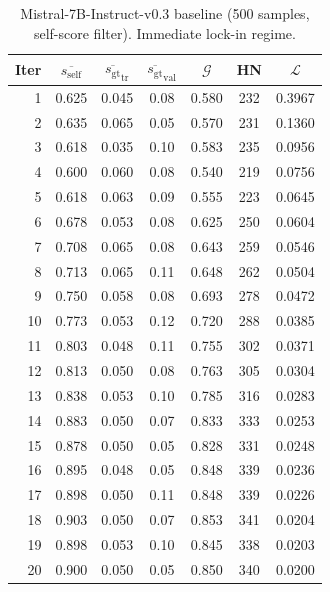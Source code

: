 \documentclass{article}
\newcommand{\gap}{\mathcal{G}}          %
\newcommand{\self}{s_{\text{self}}}     %
\newcommand{\gt}{s_{\text{gt}}}         %
\begin{document}
\begin{table}[h]
\centering
\caption{Mistral-7B-Instruct-v0.3 baseline (500 samples, self-score filter). Immediate lock-in regime.}
\label{tab:app-mistral}
\small
\begin{tabular}{rcccccc}
\toprule
Iter & $\overline{\self}$ & $\overline{\gt}_\text{tr}$ & $\overline{\gt}_\text{val}$ & $\gap$ & HN & $\mathcal{L}$ \\
\midrule
1  & 0.625 & 0.045 & 0.08 & 0.580 & 232 & 0.3967 \\
2  & 0.635 & 0.065 & 0.05 & 0.570 & 231 & 0.1360 \\
3  & 0.618 & 0.035 & 0.10 & 0.583 & 235 & 0.0956 \\
4  & 0.600 & 0.060 & 0.08 & 0.540 & 219 & 0.0756 \\
5  & 0.618 & 0.063 & 0.09 & 0.555 & 223 & 0.0645 \\
6  & 0.678 & 0.053 & 0.08 & 0.625 & 250 & 0.0604 \\
7  & 0.708 & 0.065 & 0.08 & 0.643 & 259 & 0.0546 \\
8  & 0.713 & 0.065 & 0.11 & 0.648 & 262 & 0.0504 \\
9  & 0.750 & 0.058 & 0.08 & 0.693 & 278 & 0.0472 \\
10 & 0.773 & 0.053 & 0.12 & 0.720 & 288 & 0.0385 \\
11 & 0.803 & 0.048 & 0.11 & 0.755 & 302 & 0.0371 \\
12 & 0.813 & 0.050 & 0.08 & 0.763 & 305 & 0.0304 \\
13 & 0.838 & 0.053 & 0.10 & 0.785 & 316 & 0.0283 \\
14 & 0.883 & 0.050 & 0.07 & 0.833 & 333 & 0.0253 \\
15 & 0.878 & 0.050 & 0.05 & 0.828 & 331 & 0.0248 \\
16 & 0.895 & 0.048 & 0.05 & 0.848 & 339 & 0.0236 \\
17 & 0.898 & 0.050 & 0.11 & 0.848 & 339 & 0.0226 \\
18 & 0.903 & 0.050 & 0.07 & 0.853 & 341 & 0.0204 \\
19 & 0.898 & 0.053 & 0.10 & 0.845 & 338 & 0.0203 \\
20 & 0.900 & 0.050 & 0.05 & 0.850 & 340 & 0.0200 \\
\bottomrule
\end{tabular}
\end{table}
\end{document}
